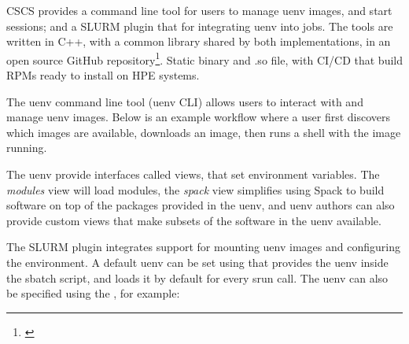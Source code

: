 CSCS provides a command line tool for users to manage uenv images, and start sessions; and a SLURM plugin that for integrating uenv into jobs.
The tools are written in C++, with a common library shared by both implementations, in an open source GitHub repository\footnote{\href{https://github.com/eth-cscs/uenv2}{}}.
Static binary and .so file, with CI/CD that build RPMs ready to install on HPE systems.

The uenv command line tool (uenv CLI) allows users to interact with and manage uenv images.
Below is an example workflow where a user first discovers which images are available, downloads an image, then runs a shell with the image running.



The uenv provide interfaces called views, that set environment variables.
The \emph{modules} view will load modules, the \emph{spack} view simplifies using Spack to build software on top of the packages provided in the uenv, and uenv authors can also provide custom views that make subsets of the software in the uenv available.

The SLURM plugin integrates support for mounting uenv images and configuring the environment.
A default uenv can be set using  that provides the uenv inside the sbatch script, and loads it by default for every srun call.
The uenv can also be specified using the , for example:


